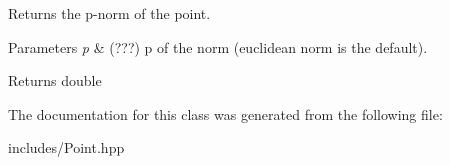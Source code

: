 Returns the p-\/norm of the point. 


\begin{DoxyParams}{Parameters}
{\em p} & (???) p of the norm (euclidean norm is the default). \\
\hline
\end{DoxyParams}
\begin{DoxyReturn}{Returns}
double 
\end{DoxyReturn}


The documentation for this class was generated from the following file\+:\begin{DoxyCompactItemize}
\item 
includes/Point.\+hpp\end{DoxyCompactItemize}
